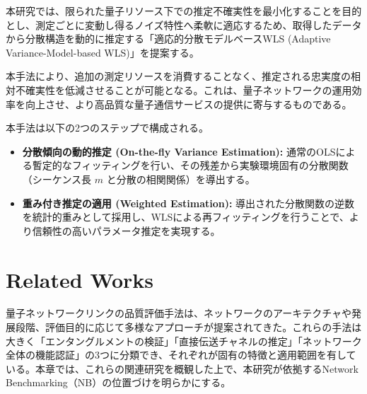 \documentclass[12pt,a4paper,titlepage,dvipdfmx]{article}
\begin{document}
本研究では、限られた量子リソース下での推定不確実性を最小化することを目的とし、測定ごとに変動し得るノイズ特性へ柔軟に適応するため、取得したデータから分散構造を動的に推定する「適応的分散モデルベースWLS (Adaptive Variance-Model-based WLS)」を提案する。

本手法により、追加の測定リソースを消費することなく、推定される忠実度の相対不確実性を低減させることが可能となる。これは、量子ネットワークの運用効率を向上させ、より高品質な量子通信サービスの提供に寄与するものである。

本手法は以下の2つのステップで構成される。

\begin{itemize}
    \item \textbf{分散傾向の動的推定 (On-the-fly Variance Estimation):} 通常のOLSによる暫定的なフィッティングを行い、その残差から実験環境固有の分散関数（シーケンス長 $m$ と分散の相関関係）を導出する。
    \item \textbf{重み付き推定の適用 (Weighted Estimation):} 導出された分散関数の逆数を統計的重みとして採用し、WLSによる再フィッティングを行うことで、より信頼性の高いパラメータ推定を実現する。
\end{itemize}



\newpage


\section{Related Works}
\label{sec:relatedworks}
量子ネットワークリンクの品質評価手法は、ネットワークのアーキテクチャや発展段階、評価目的に応じて多様なアプローチが提案されてきた。これらの手法は大きく「エンタングルメントの検証」「直接伝送チャネルの推定」「ネットワーク全体の機能認証」の3つに分類でき、それぞれが固有の特徴と適用範囲を有している。本章では、これらの関連研究を概観した上で、本研究が依拠するNetwork Benchmarking（NB）の位置づけを明らかにする。
\end{document}
